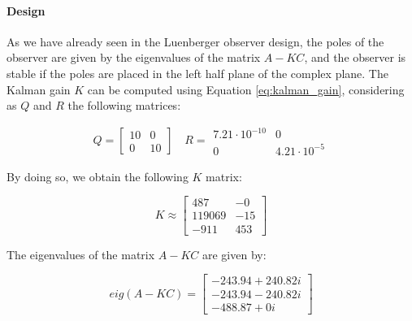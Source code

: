 \paragraph{Design}

As we have already seen in the Luenberger observer design, the poles of the observer are given by the eigenvalues of the matrix $A - KC$, and the observer is stable if the poles are placed in the left half plane of the complex plane.
The Kalman gain $K$ can be computed using Equation \ref{eq:kalman_gain}, considering as $Q$ and $R$ the following matrices:

\begin{equation}
    Q = \begin{bmatrix}
        10 & 0  \\
        0  & 10
    \end{bmatrix}
    \quad
    R = \begin{matrix}
        7.21 \cdot 10^{-10} & 0                  \\
        0                   & 4.21 \cdot 10^{-5}
    \end{matrix}
\end{equation}

By doing so, we obtain the following $K$ matrix:

\begin{equation}
    K \approx \begin{bmatrix}
        487    & -0  \\
        119069 & -15 \\
        -911   & 453
    \end{bmatrix}
    \label{eq:kalman_gain_matrix}
\end{equation}

The eigenvalues of the matrix $A - KC$ are given by:

\begin{equation}
    eig(A - K C) =
    \begin{bmatrix}
        -243.94 + 240.82i \\
        -243.94 - 240.82i \\
        -488.87 + 0i
    \end{bmatrix}
    \label{eq:K_kalman}
\end{equation}



